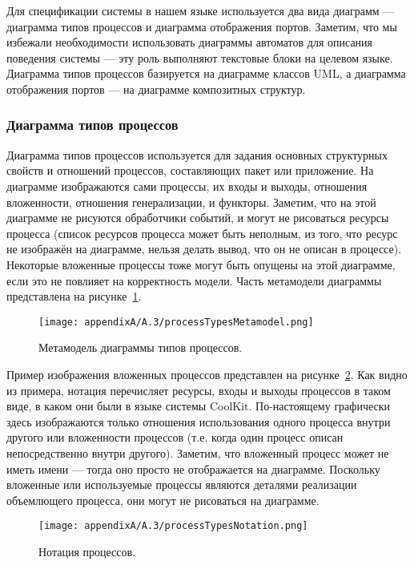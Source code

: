 Для спецификации системы в нашем языке используется два вида диаграмм --- диаграмма 
типов процессов и диаграмма отображения портов. Заметим, что мы избежали необходимости 
использовать диаграммы автоматов для описания поведения системы --- эту роль выполняют 
текстовые блоки на целевом языке. Диаграмма типов процессов базируется на диаграмме 
классов UML, а диаграмма отображения портов --- на диаграмме композитных структур.

\subsubsection{Диаграмма типов процессов}
Диаграмма типов процессов используется для задания основных структурных свойств и 
отношений процессов, составляющих пакет или приложение. На диаграмме изображаются сами 
процессы, их входы и выходы, отношения вложенности, отношения генерализации, и функторы. 
Заметим, что на этой диаграмме не рисуются обработчики событий, и могут не рисоваться 
ресурсы процесса (список ресурсов процесса может быть неполным, из того, что ресурс 
не изображён на диаграмме, нельзя делать вывод, что он не описан в процессе). Некоторые 
вложенные процессы тоже могут быть опущены на этой диаграмме, если это не повлияет 
на корректность модели. Часть метамодели диаграммы представлена на рисунке~\ref{image:processTypesMetamodel}.

\begin{figure} [ht]
	\begin{center}
		\texttt{[image: appendixA/A.3/processTypesMetamodel.png]}
		\caption{Метамодель диаграммы типов процессов.}
		\label{image:processTypesMetamodel}
	\end{center}
\end{figure}

Пример изображения вложенных процессов представлен на рисунке~\ref{image:processTypesNotation}. 
Как видно из примера, нотация перечисляет ресурсы, входы и выходы процессов в таком 
виде, в каком они были в языке системы CoolKit. По-настоящему графически здесь изображаются 
только отношения использования одного процесса внутри другого или вложенности процессов 
(т.е. когда один процесс описан непосредственно внутри другого). Заметим, что вложенный 
процесс может не иметь имени --- тогда оно просто не отображается на диаграмме. Поскольку 
вложенные или используемые процессы являются деталями реализации объемлющего процесса, 
они могут не рисоваться на диаграмме. 

\begin{figure} [ht]
	\begin{center}
		\texttt{[image: appendixA/A.3/processTypesNotation.png]}
		\caption{Нотация процессов.}
		\label{image:processTypesNotation}
	\end{center}
\end{figure}

